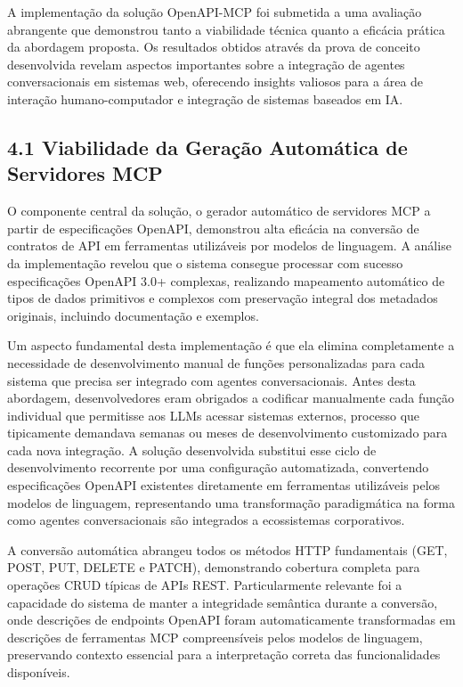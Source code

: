\documentclass[
]{article}
\begin{document}
A implementação da solução OpenAPI-MCP foi submetida a uma avaliação
abrangente que demonstrou tanto a viabilidade técnica quanto a eficácia
prática da abordagem proposta. Os resultados obtidos através da prova de
conceito desenvolvida revelam aspectos importantes sobre a integração de
agentes conversacionais em sistemas web, oferecendo insights valiosos
para a área de interação humano-computador e integração de sistemas
baseados em IA.

\subsection{4.1 Viabilidade da Geração Automática de Servidores
MCP}\label{viabilidade-da-gerauxe7uxe3o-automuxe1tica-de-servidores-mcp}

O componente central da solução, o gerador automático de servidores MCP
a partir de especificações OpenAPI, demonstrou alta eficácia na
conversão de contratos de API em ferramentas utilizáveis por modelos de
linguagem. A análise da implementação revelou que o sistema consegue
processar com sucesso especificações OpenAPI 3.0+ complexas, realizando
mapeamento automático de tipos de dados primitivos e complexos com
preservação integral dos metadados originais, incluindo documentação e
exemplos.

Um aspecto fundamental desta implementação é que ela elimina
completamente a necessidade de desenvolvimento manual de funções
personalizadas para cada sistema que precisa ser integrado com agentes
conversacionais. Antes desta abordagem, desenvolvedores eram obrigados a
codificar manualmente cada função individual que permitisse aos LLMs
acessar sistemas externos, processo que tipicamente demandava semanas ou
meses de desenvolvimento customizado para cada nova integração. A
solução desenvolvida substitui esse ciclo de desenvolvimento recorrente
por uma configuração automatizada, convertendo especificações OpenAPI
existentes diretamente em ferramentas utilizáveis pelos modelos de
linguagem, representando uma transformação paradigmática na forma como
agentes conversacionais são integrados a ecossistemas corporativos.

A conversão automática abrangeu todos os métodos HTTP fundamentais (GET,
POST, PUT, DELETE e PATCH), demonstrando cobertura completa para
operações CRUD típicas de APIs REST. Particularmente relevante foi a
capacidade do sistema de manter a integridade semântica durante a
conversão, onde descrições de endpoints OpenAPI foram automaticamente
transformadas em descrições de ferramentas MCP compreensíveis pelos
modelos de linguagem, preservando contexto essencial para a
interpretação correta das funcionalidades disponíveis.
\end{document}
